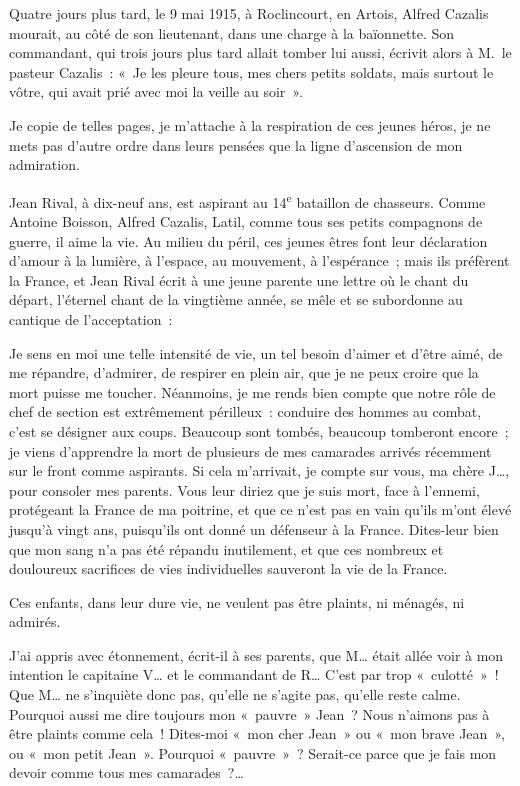 \documentclass[french,twoside]{book} %
\newenvironment{quoteblock}%
  {\begin{quoting}}
  {\end{quoting}}
\newenvironment{quotebar}{%
    \def\FrameCommand{{\color{rubric!10!}\vrule width 0.5em} \hspace{0.9em}}%
    \def\OuterFrameSep{\itemsep} %
    \MakeFramed {\advance\hsize-\width \FrameRestore}
  }%
  {%
    \endMakeFramed
  }
\renewenvironment{quoteblock}%
  {%
    \savenotes
    \setstretch{0.9}
    \normalfont
    \begin{quotebar}
  }
  {%
    \end{quotebar}
    \spewnotes
  }
\begin{document}
\noindent Quatre jours plus tard, le 9 mai 1915, à Roclincourt, en Artois, Alfred Cazalis mourait, au côté de son lieutenant, dans une charge à la baïonnette. Son commandant, qui trois jours plus tard allait tomber lui aussi, écrivit alors à M. le pasteur Cazalis : « Je les pleure tous, mes chers petits soldats, mais surtout le vôtre, qui avait prié avec moi la veille au soir ».‌\par
Je copie de telles pages, je m’attache à la respiration de ces jeunes héros, je ne mets pas d’autre ordre dans leurs pensées que la ligne d’ascension de mon admiration.‌\par
Jean Rival, à dix-neuf ans, est aspirant au 14\textsuperscript{e} bataillon de chasseurs. Comme Antoine Boisson, Alfred Cazalis, Latil, comme tous ses petits compagnons de guerre, il aime la vie. Au milieu du péril, ces jeunes êtres font leur déclaration d’amour à la lumière, à l’espace, au mouvement, à l’espérance ; mais ils préfèrent la France, et Jean Rival écrit à une jeune parente une lettre où le chant du départ, l’éternel chant de la vingtième année, se mêle et se subordonne au cantique de l’acceptation :‌\par

\begin{quoteblock}
 \noindent Je sens en moi une telle intensité de vie, un tel besoin d’aimer et d’être aimé, de me répandre, d’admirer, de respirer en plein air, que je ne peux croire que la mort puisse me toucher. Néanmoins, je me rends bien compte que notre rôle de chef de section est extrêmement périlleux : conduire des hommes au combat, c’est se désigner aux coups. Beaucoup sont tombés, beaucoup tomberont encore ; je viens d’apprendre la mort de plusieurs de mes camarades arrivés récemment sur le front comme aspirants. Si cela m’arrivait, je compte sur vous, ma chère J…, pour consoler mes parents. Vous leur diriez que je suis mort, face à l’ennemi, protégeant la France de ma poitrine, et que ce n’est pas en vain qu’ils m’ont élevé jusqu’à vingt ans, puisqu’ils ont donné un défenseur à la France. Dites-leur bien que mon sang n’a pas été répandu inutilement, et que ces nombreux et douloureux sacrifices de vies individuelles sauveront la vie de la France.‌
 \end{quoteblock}

\noindent Ces enfants, dans leur dure vie, ne veulent pas être plaints, ni ménagés, ni admirés.‌\par

\begin{quoteblock}
 \noindent J’ai appris avec étonnement, écrit-il à ses parents, que M… était allée voir à mon intention le capitaine V… et le commandant de R… C’est par trop « culotté » ! Que M… ne s’inquiète donc pas, qu’elle ne s’agite pas, qu’elle reste calme. Pourquoi aussi me dire toujours mon « pauvre » Jean ? Nous n’aimons pas à être plaints comme cela ! Dites-moi « mon cher Jean » ou « mon brave Jean », ou « mon petit Jean ». Pourquoi « pauvre » ? Serait-ce parce que je fais mon devoir comme tous mes camarades ?…‌
 \end{quoteblock}
\end{document}

